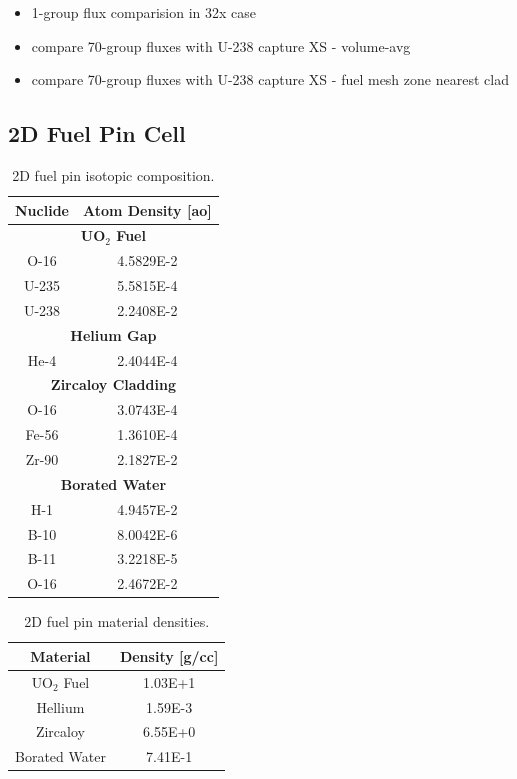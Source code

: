 \begin{itemize}
  \item 1-group flux comparision in 32x case
  \item compare 70-group fluxes with U-238 capture XS - volume-avg
  \item compare 70-group fluxes with U-238 capture XS - fuel mesh zone nearest clad
\end{itemize}

\subsection{2D Fuel Pin Cell}
\label{subsec:chap4-pin}

\begin{table}[h!]
  \centering
  \caption{2D fuel pin isotopic composition.}
  \label{table:chap2-pin-isotopes} 
  \vspace{14pt}
  \begin{tabular}{c c}
  \toprule
  \multicolumn{1}{c}{\bf Nuclide} &
  \multicolumn{1}{c}{\bf Atom Density [ao]} \\
  \midrule
  \multicolumn{2}{c}{\bf UO$_2$ Fuel} \\
  \midrule
  O-16 & 4.5829E-2 \\
  U-235 & 5.5815E-4 \\
  U-238 & 2.2408E-2 \\
  \midrule
  \multicolumn{2}{c}{\bf Helium Gap} \\
  \midrule
  He-4 & 2.4044E-4 \\
  \midrule
  \multicolumn{2}{c}{\bf Zircaloy Cladding} \\
  \midrule
  O-16 & 3.0743E-4 \\
  Fe-56 & 1.3610E-4 \\
  Zr-90 & 2.1827E-2 \\
  \midrule
  \multicolumn{2}{c}{\bf Borated Water}  \\
  \midrule
  H-1 & 4.9457E-2 \\
  B-10 & 8.0042E-6 \\
  B-11 & 3.2218E-5 \\
  O-16 & 2.4672E-2 \\
  \bottomrule
\end{tabular}
\end{table}

\begin{table}[h!]
  \centering
  \caption{2D fuel pin material densities.}
  \label{table:chap2-pin-densities} 
  \vspace{14pt}
  \begin{tabular}{c c}
  \toprule
  \multicolumn{1}{c}{\bf Material} &
  \multicolumn{1}{c}{\bf Density [g/cc]} \\
  \midrule
  UO$_2$ Fuel & 1.03E+1 \\
  Hellium & 1.59E-3 \\
  Zircaloy & 6.55E+0 \\
  Borated Water & 7.41E-1 \\   
  \bottomrule
\end{tabular}
\end{table}

